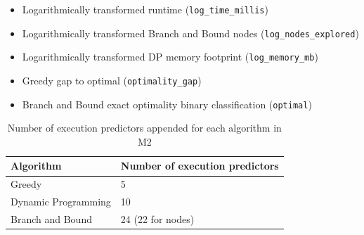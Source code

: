 \documentclass[sigconf]{acmart}
\begin{document}
\begin{itemize}
\begin{itemize}
  \item Logarithmically transformed runtime (\texttt{log\_time\_millis})
  \item Logarithmically transformed Branch and Bound nodes (\texttt{log\_nodes\_explored})
  \item Logarithmically transformed DP memory footprint (\texttt{log\_memory\_mb})
  \item Greedy gap to optimal (\texttt{optimality\_gap})
  \item Branch and Bound exact optimality binary classification (\texttt{optimal})
\end{itemize}
\end{itemize}

\begin{table}[t]
\centering
\caption{Number of execution predictors appended for each algorithm in M2}
\label{tab:predictor_counts}
\begin{tabular}{ll}
\toprule
\textbf{Algorithm} & \textbf{Number of execution predictors} \\
\midrule
Greedy & 5 \\
Dynamic Programming & 10 \\
Branch and Bound & 24 (22 for nodes) \\
\bottomrule
\end{tabular}
\end{table}
\end{document}
